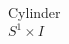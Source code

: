 \documentclass[preview]{standalone}
\begin{document}
\begin{center}
Cylinder\\$S^1 \times I$
\end{center}
\end{document}
